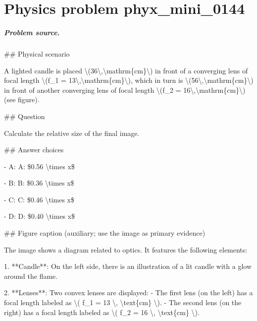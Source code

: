 
\chapter{Physics problem phyx\_mini\_0144}
\label{ch:PhyXMiniProblems_problem_phyx_mini_0144}

\paragraph{Problem source.}
\#\# Physical scenario

A lighted candle is placed \textbackslash{}(36\textbackslash{},\textbackslash{}mathrm\{cm\}\textbackslash{}) in front of a converging lens of focal length \textbackslash{}(f\_1 = 13\textbackslash{},\textbackslash{}mathrm\{cm\}\textbackslash{}), which in turn is \textbackslash{}(56\textbackslash{},\textbackslash{}mathrm\{cm\}\textbackslash{}) in front of another converging lens of focal length \textbackslash{}(f\_2 = 16\textbackslash{},\textbackslash{}mathrm\{cm\}\textbackslash{}) (see figure).

\#\# Question

Calculate the relative size of the final image.

\#\# Answer choices

- A: A: \$0.56 \textbackslash{}times x\$

- B: B: \$0.36 \textbackslash{}times x\$

- C: C: \$0.46 \textbackslash{}times x\$

- D: D: \$0.40 \textbackslash{}times x\$

\#\# Figure caption (auxiliary; use the image as primary evidence)

The image shows a diagram related to optics. It features the following elements:

1. **Candle**: On the left side, there is an illustration of a lit candle with a glow around the flame.

2. **Lenses**: Two convex lenses are displayed:
   - The first lens (on the left) has a focal length labeled as \textbackslash{}( f\_1 = 13 \textbackslash{}, \textbackslash{}text\{cm\} \textbackslash{}).
   - The second lens (on the right) has a focal length labeled as \textbackslash{}( f\_2 = 16 \textbackslash{}, \textbackslash{}text\{cm\} \textbackslash{}).

